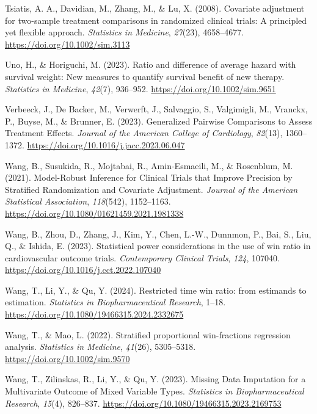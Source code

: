 \documentclass[
  letterpaper,
  DIV=11,
  numbers=noendperiod]{scrreprt}
\newlength{\cslhangindent}
\newlength{\cslentryspacingunit} %
\newenvironment{CSLReferences}[2] %
 {%
  \setlength{\parindent}{0pt}
  \ifodd #1
  \let\oldpar\par
  \def\par{\hangindent=\cslhangindent\oldpar}
  \fi
  \setlength{\parskip}{#2\cslentryspacingunit}
 }%
 {}
\begin{document}
\begin{CSLReferences}{1}{0}
\leavevmode{}%
Tsiatis, A. A., Davidian, M., Zhang, M., \& Lu, X. (2008). Covariate
adjustment for two{-}sample treatment comparisons in randomized clinical
trials: A principled yet flexible approach. \emph{Statistics in
Medicine}, \emph{27}(23), 4658--4677.
\url{https://doi.org/10.1002/sim.3113}

\leavevmode{}%
Uno, H., \& Horiguchi, M. (2023). Ratio and difference of average hazard
with survival weight: New measures to quantify survival benefit of new
therapy. \emph{Statistics in Medicine}, \emph{42}(7), 936--952.
\url{https://doi.org/10.1002/sim.9651}

\leavevmode{}%
Verbeeck, J., De Backer, M., Verwerft, J., Salvaggio, S., Valgimigli,
M., Vranckx, P., Buyse, M., \& Brunner, E. (2023). Generalized Pairwise
Comparisons to Assess Treatment Effects. \emph{Journal of the American
College of Cardiology}, \emph{82}(13), 1360--1372.
\url{https://doi.org/10.1016/j.jacc.2023.06.047}

\leavevmode{}%
Wang, B., Susukida, R., Mojtabai, R., Amin-Esmaeili, M., \& Rosenblum,
M. (2021). Model-Robust Inference for Clinical Trials that Improve
Precision by Stratified Randomization and Covariate Adjustment.
\emph{Journal of the American Statistical Association}, \emph{118}(542),
1152--1163. \url{https://doi.org/10.1080/01621459.2021.1981338}

\leavevmode{}%
Wang, B., Zhou, D., Zhang, J., Kim, Y., Chen, L.-W., Dunnmon, P., Bai,
S., Liu, Q., \& Ishida, E. (2023). Statistical power considerations in
the use of win ratio in cardiovascular outcome trials.
\emph{Contemporary Clinical Trials}, \emph{124}, 107040.
\url{https://doi.org/10.1016/j.cct.2022.107040}

\leavevmode{}%
Wang, T., Li, Y., \& Qu, Y. (2024). Restricted time win ratio: from
estimands to estimation. \emph{Statistics in Biopharmaceutical
Research}, 1--18. \url{https://doi.org/10.1080/19466315.2024.2332675}

\leavevmode{}%
Wang, T., \& Mao, L. (2022). Stratified proportional win{-}fractions
regression analysis. \emph{Statistics in Medicine}, \emph{41}(26),
5305--5318. \url{https://doi.org/10.1002/sim.9570}

\leavevmode{}%
Wang, T., Zilinskas, R., Li, Y., \& Qu, Y. (2023). Missing Data
Imputation for a Multivariate Outcome of Mixed Variable Types.
\emph{Statistics in Biopharmaceutical Research}, \emph{15}(4), 826--837.
\url{https://doi.org/10.1080/19466315.2023.2169753}


\end{CSLReferences}
\end{document}
